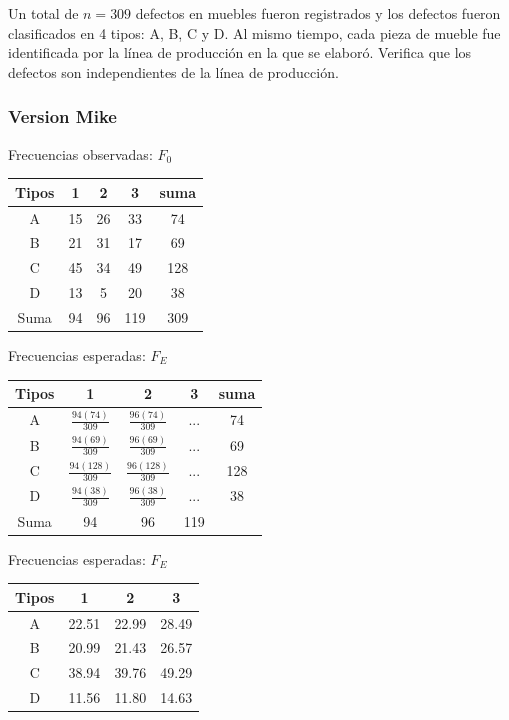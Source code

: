 \documentclass{article}
\begin{document}
Un total de \( n=309 \) defectos en muebles fueron registrados y los defectos fueron clasificados en 4 tipos: A, B, C y D. Al mismo tiempo, cada pieza de mueble fue identificada por la línea de producción en la que se elaboró. Verifica que los defectos son independientes de la línea de producción.

\subsubsection*{Version Mike}
Frecuencias observadas: $F_0$
\begin{center}
    \begin{tabular}{c c c c | c}
        Tipos & 1  & 2  & 3   & suma \\
        \hline
        A     & 15 & 26 & 33  & 74   \\
        B     & 21 & 31 & 17  & 69   \\
        C     & 45 & 34 & 49  & 128  \\
        D     & 13 & 5  & 20  & 38   \\
        \hline
        Suma  & 94 & 96 & 119 & 309
    \end{tabular}
\end{center}

Frecuencias esperadas: $F_E$
\begin{center}
    \begin{tabular}{c c c c | c}
        Tipos & 1                     & 2                     & 3   & suma \\
        \hline
        A     & $\frac{94(74)}{309}$  & $\frac{96(74)}{309}$  & ... & 74   \\
        B     & $\frac{94(69)}{309}$  & $\frac{96(69)}{309}$  & ... & 69   \\
        C     & $\frac{94(128)}{309}$ & $\frac{96(128)}{309}$ & ... & 128  \\
        D     & $\frac{94(38)}{309}$  & $\frac{96(38)}{309}$  & ... & 38   \\
        \hline
        Suma  & 94                    & 96                    & 119
    \end{tabular}
\end{center}

Frecuencias esperadas: $F_E$
\begin{center}
    \begin{tabular}{c c c c }
        Tipos & 1     & 2     & 3     \\
        \hline
        A     & 22.51 & 22.99 & 28.49 \\
        B     & 20.99 & 21.43 & 26.57 \\
        C     & 38.94 & 39.76 & 49.29 \\
        D     & 11.56 & 11.80 & 14.63 \\
    \end{tabular}
\end{center}
\end{document}
